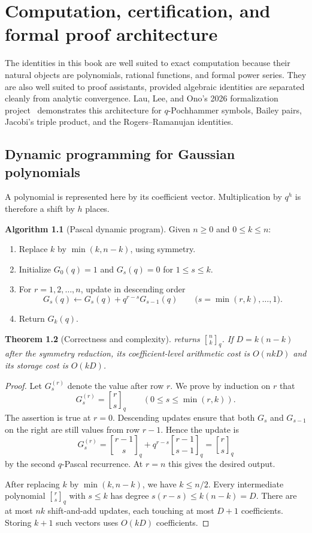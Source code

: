 \documentclass[11pt,oneside,openany]{book}
\newtheorem{theorem}{Theorem}[chapter]
\theoremstyle{definition}
\newtheorem{algorithm}[theorem]{Algorithm}
\theoremstyle{remark}
\newcommand{\qbinom}[2]{\genfrac{[}{]}{0pt}{}{#1}{#2}_{q}}
\newcommand{\Qbinom}[3]{\genfrac{[}{]}{0pt}{}{#1}{#2}_{#3}}
\begin{document}
\chapter{Computation, certification, and formal proof architecture}\label{chap:formalization}

The identities in this book are well suited to exact computation because their natural objects are polynomials, rational functions, and formal power series.  They are also well suited to proof assistants, provided algebraic identities are separated cleanly from analytic convergence.  Lau, Lee, and Ono's 2026 formalization project~\cite{LauLeeOno2026} demonstrates this architecture for $q$-Pochhammer symbols, Bailey pairs, Jacobi's triple product, and the Rogers--Ramanujan identities.

\section{Dynamic programming for Gaussian polynomials}

A polynomial is represented here by its coefficient vector.  Multiplication by $q^h$ is therefore a shift by $h$ places.

\begin{algorithm}[Pascal dynamic program]\label{alg:gaussian-dp}
Given $n\ge0$ and $0\le k\le n$:
\begin{enumerate}
\item Replace $k$ by $\min(k,n-k)$, using symmetry.
\item Initialize $G_0(q)=1$ and $G_s(q)=0$ for $1\le s\le k$.
\item For $r=1,2,\ldots,n$, update in descending order
\[
 G_s(q)\leftarrow G_s(q)+q^{r-s}G_{s-1}(q)
 \qquad
 \bigl(s=\min(r,k),\ldots,1\bigr).
\]
\item Return $G_k(q)$.
\end{enumerate}
\end{algorithm}

\begin{theorem}[Correctness and complexity]\label{thm:gaussian-dp-correct}
 returns $\qbinom nk$.  If $D=k(n-k)$ after the symmetry reduction, its coefficient-level arithmetic cost is $O(nkD)$ and its storage cost is $O(kD)$.
\end{theorem}

\begin{proof}
Let $G_s^{(r)}$ denote the value after row $r$.  We prove by induction on $r$ that
\[
 G_s^{(r)}=\Qbinom rsq
 \qquad(0\le s\le\min(r,k)).
\]
The assertion is true at $r=0$.  Descending updates ensure that both $G_s$ and $G_{s-1}$ on the right are still values from row $r-1$.  Hence the update is
\[
 G_s^{(r)}
 =\Qbinom{r-1}{s}q+q^{r-s}\Qbinom{r-1}{s-1}q
 =\Qbinom rsq
\]
by the second $q$-Pascal recurrence.  At $r=n$ this gives the desired output.

After replacing $k$ by $\min(k,n-k)$, we have $k\le n/2$.  Every intermediate polynomial $\Qbinom rsq$ with $s\le k$ has degree $s(r-s)\le k(n-k)=D$.  There are at most $nk$ shift-and-add updates, each touching at most $D+1$ coefficients.  Storing $k+1$ such vectors uses $O(kD)$ coefficients.
\end{proof}
\end{document}
